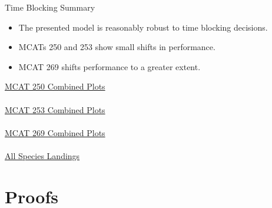 \documentclass[ xcolor = pdftex, dvipsnames, table ]{beamer}
\begin{document}
\begin{frame}{Time Blocking Summary}	
        \begin{minipage}{0.49\textwidth}
	\begin{itemize}
	\item The presented model is reasonably robust to time blocking decisions.
	\item MCATs 250 and 253 show small shifts in performance.
	\item MCAT 269 shifts performance to a greater extent.  
	\end{itemize}
	\end{minipage}
        \begin{minipage}{0.49\textwidth}
	\begin{center}
	\href{https://github.com/gasduster99/sppComp/tree/master/try1/postSSC/25019781982345M4}{MCAT 250 Combined Plots}\\$~$\\
	\href{https://github.com/gasduster99/sppComp/tree/master/try1/postSSC/25319781982345M4}{MCAT 253 Combined Plots}\\$~$\\
	\href{https://github.com/gasduster99/sppComp/tree/master/try1/postSSC/26919781982345M4}{MCAT 269 Combined Plots}\\$~$\\
	\href{https://github.com/gasduster99/sppComp/tree/master/try1/postSSC/landDiagnostics/82345M4}{All Species Landings}
	\end{center}
	\end{minipage}
\end{frame}

%
%

%
\section{Proofs}
\end{document}

